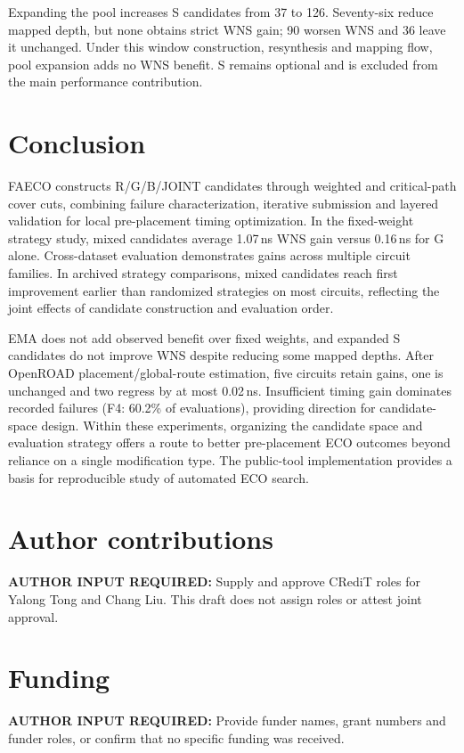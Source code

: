 \documentclass[preprint,12pt]{elsarticle}
\newcommand{\AuthorInput}[1]{\textbf{AUTHOR INPUT REQUIRED:} #1}
\begin{document}
Expanding the pool increases S candidates from 37 to 126. Seventy-six reduce mapped depth, but none obtains strict WNS gain; 90 worsen WNS and 36 leave it unchanged. Under this window construction, resynthesis and mapping flow, pool expansion adds no WNS benefit. S remains optional and is excluded from the main performance contribution.

\FloatBarrier
\section{Conclusion}\label{sec:conclusion}
FAECO constructs R/G/B/JOINT candidates through weighted and critical-path cover cuts, combining failure characterization, iterative submission and layered validation for local pre-placement timing optimization. In the fixed-weight strategy study, mixed candidates average 1.07\,ns WNS gain versus 0.16\,ns for G alone. Cross-dataset evaluation demonstrates gains across multiple circuit families. In archived strategy comparisons, mixed candidates reach first improvement earlier than randomized strategies on most circuits, reflecting the joint effects of candidate construction and evaluation order.

EMA does not add observed benefit over fixed weights, and expanded S candidates do not improve WNS despite reducing some mapped depths. After OpenROAD placement/global-route estimation, five circuits retain gains, one is unchanged and two regress by at most 0.02\,ns. Insufficient timing gain dominates recorded failures (F4: 60.2\% of evaluations), providing direction for candidate-space design. Within these experiments, organizing the candidate space and evaluation strategy offers a route to better pre-placement ECO outcomes beyond reliance on a single modification type. The public-tool implementation provides a basis for reproducible study of automated ECO search.

\section*{Author contributions}
\AuthorInput{Supply and approve CRediT roles for Yalong Tong and Chang Liu. This draft does not assign roles or attest joint approval.}

\section*{Funding}
\AuthorInput{Provide funder names, grant numbers and funder roles, or confirm that no specific funding was received.}
\end{document}
